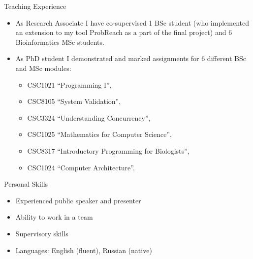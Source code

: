 \documentclass{resume} %
\begin{document}
\begin{rSection}{Teaching Experience}
\begin{itemize}
	\item As Research Associate I have co-supervised 1 BSc student (who implemented an extension
	to my tool ProbReach as a part of the final project)
	and 6 Bioinformatics MSc students.

	\item As PhD student I demonstrated and marked assignments for 6 different
	 BSc and MSc modules:
	\begin{itemize}
		\item CSC1021 ``Programming I'',
		\item CSC8105 ``System Validation'',
		\item CSC3324 ``Understanding Concurrency'',
		\item CSC1025 ``Mathematics for Computer Science'',
		\item CSC8317 ``Introductory Programming for Biologists'',
		\item CSC1024 ``Computer Architecture''.
	\end{itemize}
\end{itemize}
\end{rSection}


\begin{rSection}{Personal Skills}
\begin{itemize}
	\item Experienced public speaker and presenter
	\item Ability to work in a team
	\item Supervisory skills
	\item Languages: English (fluent), Russian (native)
\end{itemize}
\end{rSection}








\end{document}
